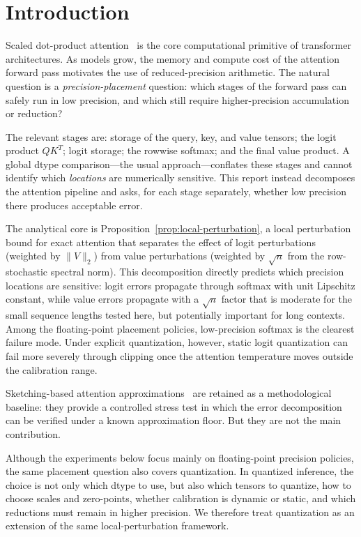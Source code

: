 \section{Introduction}

Scaled dot-product attention~\autocite{Vaswani2017} is the core computational primitive of transformer architectures. As models grow, the memory and compute cost of the attention forward pass motivates the use of reduced-precision arithmetic. The natural question is a \emph{precision-placement} question: which stages of the forward pass can safely run in low precision, and which still require higher-precision accumulation or reduction?

The relevant stages are: storage of the query, key, and value tensors; the logit product $QK^T$; logit storage; the rowwise softmax; and the final value product. A global dtype comparison---the usual approach---conflates these stages and cannot identify which \emph{locations} are numerically sensitive. This report instead decomposes the attention pipeline and asks, for each stage separately, whether low precision there produces acceptable error.

The analytical core is Proposition~\ref{prop:local-perturbation}, a local perturbation bound for exact attention that separates the effect of logit perturbations (weighted by $\|V\|_2$) from value perturbations (weighted by $\sqrt{n}$ from the row-stochastic spectral norm). This decomposition directly predicts which precision locations are sensitive: logit errors propagate through softmax with unit Lipschitz constant, while value errors propagate with a $\sqrt{n}$ factor that is moderate for the small sequence lengths tested here, but potentially important for long contexts. Among the floating-point placement policies, low-precision softmax is the clearest failure mode. Under explicit quantization, however, static logit quantization can fail more severely through clipping once the attention temperature moves outside the calibration range.

Sketching-based attention approximations~\autocite{HalkoMartinssonTropp2011, Mahoney2016, WangEtAl2020, XiongEtAl2021, ChoromanskiEtAl2021} are retained as a methodological baseline: they provide a controlled stress test in which the error decomposition can be verified under a known approximation floor. But they are not the main contribution.

Although the experiments below focus mainly on floating-point precision policies, the same placement question also covers quantization. In quantized inference, the choice is not only which dtype to use, but also which tensors to quantize, how to choose scales and zero-points, whether calibration is dynamic or static, and which reductions must remain in higher precision. We therefore treat quantization as an extension of the same local-perturbation framework.

